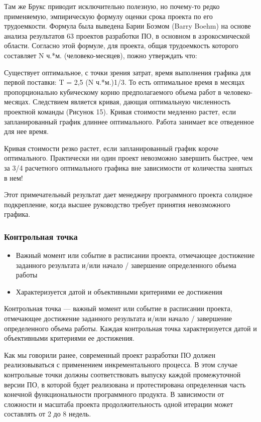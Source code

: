 \documentclass{../industrial-development}
\begin{document}
Там же Брукс приводит исключительно полезную, но почему-то редко применяемую, эмпирическую формулу оценки срока проекта по его трудоемкости. Формула была выведена Барии Боэмом (Barry Boehm) на основе анализа результатов 63 проектов разработки ПО, в основном в аэрокосмической области. Согласно этой формуле, для проекта, общая трудоемкость которого составляет N ч.*м. (человеко-месяцев), пожно утверждать что:

Существует оптимальное, с точки зрения затрат, время выполнения графика для первой поставки: T = 2,5 (N ч.*м.)1/3. То есть оптимальное время в месяцах пропорционально кубическому корню предполагаемого объема работ в человеко-месяцах. Следствием является кривая, дающая оптимальную численность проектной команды (Рисунок 15).
Кривая стоимости медленно растет, если запланированный график длиннее оптимального. Работа занимает все отведенное для нее время.

Кривая стоимости резко растет, если запланированный график короче оптимального. Практически ни один проект невозможно завершить быстрее, чем за 3/4 расчетного оптимального графика вне зависимости от количества занятых в нем!

Этот примечательный результат дает менеджеру программного проекта солидное подкрепление, когда высшее руководство требует принятия невозможного графика.

    \begin{frame} \frametitle{Контрольная точка}
	\begin{itemize}
		\item Важный момент или событие в расписании проекта, отмечающее достижение заданного результата и/или начало / завершение определенного объема работы
		\item Характеризуется датой и объективными критериями ее достижения
	\end{itemize}
    \end{frame}
    \lecturenotes

Контрольная точка — важный момент или событие в расписании проекта, отмечающее достижение заданного результата и/или начало / завершение определенного объема работы. Каждая контрольная точка характеризуется датой и объективными критериями ее достижения.

Как мы говорили ранее, современный проект разработки ПО должен реализовываться с применением инкрементального процесса. В этом случае контрольные точки должны соответствовать выпуску каждой промежуточной версии ПО, в которой будет реализована и протестирована определенная часть конечной функциональности программного продукта. В зависимости от сложности и масштаба проекта продолжительность одной итерации может составлять от 2 до 8 недель.
\end{document}
